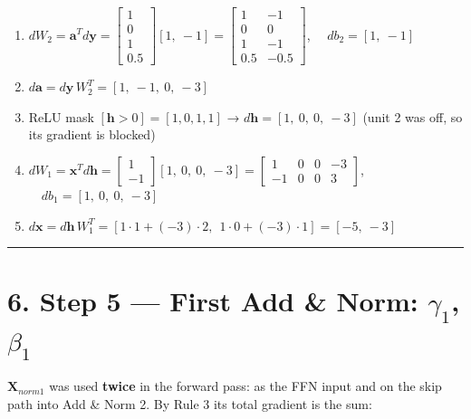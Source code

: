 \documentclass[11pt,a4paper,oneside]{report}
\providecommand{\tightlist}{\setlength{\itemsep}{0pt}\setlength{\parskip}{0pt}}
\begin{document}
\begin{enumerate}
\def\labelenumi{\arabic{enumi}.}
\tightlist
\item
  \(dW_2 = \mathbf{a}^T d\mathbf{y} = \begin{bmatrix} 1 \\ 0 \\ 1 \\ 0.5 \end{bmatrix}[1,\ -1] = \begin{bmatrix} 1 & -1 \\ 0 & 0 \\ 1 & -1 \\ 0.5 & -0.5 \end{bmatrix}\), \(\quad db_2 = [1,\ -1]\)
\item
  \(d\mathbf{a} = d\mathbf{y}\, W_2^T = [1,\ -1,\ 0,\ -3]\)
\item
  ReLU mask \([\mathbf{h} > 0] = [1, 0, 1, 1]\) → \(d\mathbf{h} = [1,\ 0,\ 0,\ -3]\) (unit 2 was off, so its gradient is blocked)
\item
  \(dW_1 = \mathbf{x}^T d\mathbf{h} = \begin{bmatrix} 1 \\ -1 \end{bmatrix}[1,\ 0,\ 0,\ -3] = \begin{bmatrix} 1 & 0 & 0 & -3 \\ -1 & 0 & 0 & 3 \end{bmatrix}\), \(\quad db_1 = [1,\ 0,\ 0,\ -3]\)
\item
  \(d\mathbf{x} = d\mathbf{h}\, W_1^T = [1\cdot 1 + (-3)\cdot 2,\ \ 1 \cdot 0 + (-3) \cdot 1] = [-5,\ -3]\)
\end{enumerate}

\begin{center}\rule{0.5\linewidth}{0.5pt}\end{center}

\section{\texorpdfstring{6. Step 5 --- First Add \& Norm: \(\gamma_1\), \(\beta_1\)}{6. Step 5 --- First Add \& Norm: \textbackslash gamma\_1, \textbackslash beta\_1}}\label{6-step-5--first-add--norm-gamma_1-beta_1}

\(\mathbf{X}_{norm1}\) was used \textbf{twice} in the forward pass: as the FFN input and on the skip path into Add \& Norm 2. By Rule 3 its total gradient is the sum:

\begin{center}\end{center}
\end{document}
